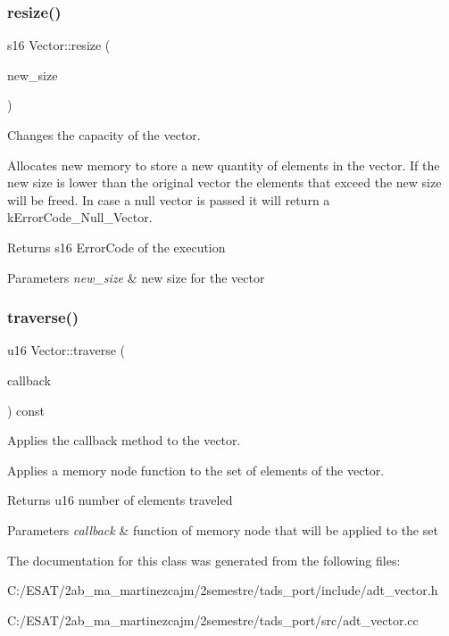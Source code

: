 \subsubsection{\texorpdfstring{resize()}{resize()}}
{\footnotesize\ttfamily s16 Vector\+::resize (\begin{DoxyParamCaption}\item[{const u16}]{new\+\_\+size }\end{DoxyParamCaption})}



Changes the capacity of the vector. 

Allocates new memory to store a new quantity of elements in the vector. If the new size is lower than the original vector the elements that exceed the new size will be freed. In case a null vector is passed it will return a k\+Error\+Code\+\_\+\+Null\+\_\+\+Vector.

\begin{DoxyReturn}{Returns}
s16 Error\+Code of the execution 
\end{DoxyReturn}

\begin{DoxyParams}{Parameters}
{\em new\+\_\+size} & new size for the vector \\
\hline
\end{DoxyParams}
\mbox{\label{class_vector_a2ccabd5bd543d4f56db38c9c2e8fdd4d}} 
\subsubsection{\texorpdfstring{traverse()}{traverse()}}
{\footnotesize\ttfamily u16 Vector\+::traverse (\begin{DoxyParamCaption}\item[{s16(Memory\+Node\+::$\ast$)()}]{callback }\end{DoxyParamCaption}) const}



Applies the callback method to the vector. 

Applies a memory node function to the set of elements of the vector.

\begin{DoxyReturn}{Returns}
u16 number of elements traveled 
\end{DoxyReturn}

\begin{DoxyParams}{Parameters}
{\em callback} & function of memory node that will be applied to the set \\
\hline
\end{DoxyParams}


The documentation for this class was generated from the following files\+:\begin{DoxyCompactItemize}
\item 
C\+:/\+E\+S\+A\+T/2ab\+\_\+ma\+\_\+martinezcajm/2semestre/tads\+\_\+port/include/adt\+\_\+vector.\+h\item 
C\+:/\+E\+S\+A\+T/2ab\+\_\+ma\+\_\+martinezcajm/2semestre/tads\+\_\+port/src/adt\+\_\+vector.\+cc\end{DoxyCompactItemize}
